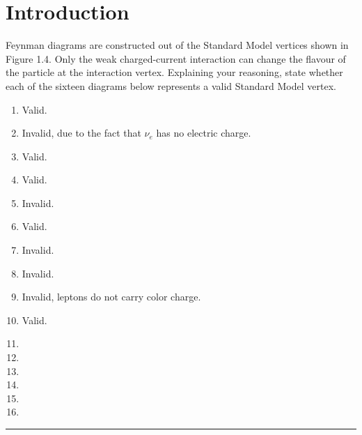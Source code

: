 \section{Introduction}

\begin{problem}{1.1}
Feynman diagrams are constructed out of the Standard Model vertices shown in Figure 1.4.
Only the weak charged-current interaction can change the flavour of the particle at the interaction vertex.
Explaining your reasoning, state whether each of the sixteen diagrams below represents a valid Standard Model vertex.
\end{problem}
\begin{solution}
\begin{enumerate}[label=(\alph*)]
    \item Valid. 
    \item Invalid, due to the fact that $\nu_e$ has no electric charge. 
    \item Valid.
    \item Valid.
    \item Invalid.
    \item Valid.
    \item Invalid.
    \item Invalid.
    \item Invalid, leptons do not carry color charge.
    \item Valid. 
    \item 
    \item
    \item
    \item
    \item
    \item
\end{enumerate}
\end{solution} 
\noindent\rule{7in}{1.5pt}
    
    

